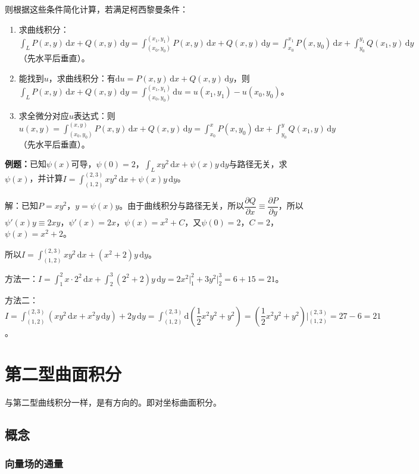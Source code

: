 则根据这些条件简化计算，若满足柯西黎曼条件：

\begin{enumerate}
    \item 求曲线积分：$\int_LP(x,y)\,\textrm{d}x+Q(x,y)\,\textrm{d}y=\int_{(x_0,y_0)}^{(x_1,y_1)}P(x,y)\,\textrm{d}x+Q(x,y)\,\textrm{d}y=\int_{x_0}^{x_1}P(x,y_0)\,\textrm{d}x+\int_{y_0}^{y_1}Q(x_1,y)\,\textrm{d}y$（先水平后垂直）。
    \item 能找到$u$，求曲线积分：有$\textrm{d}u=P(x,y)\,\textrm{d}x+Q(x,y)\,\textrm{d}y$，则$\int_LP(x,y)\,\textrm{d}x+Q(x,y)\,\textrm{d}y=\int_{(x_0,y_0)}^{(x_1,y_1)}\textrm{d}u=u(x_1,y_1)-u(x_0,y_0)$。
    \item 求全微分对应$u$表达式：则$u(x,y)=\int_{(x_0,y_0)}^{(x,y)}P(x,y)\,\textrm{d}x+Q(x,y)\,\textrm{d}y=\int_{x_0}^xP(x,y_0)\,\textrm{d}x+\int_{y_0}^yQ(x_1,y)\,\textrm{d}y$（先水平后垂直）。
\end{enumerate}

\textbf{例题：}已知$\psi(x)$可导，$\psi(0)=2$，$\int_Lxy^2\,\textrm{d}x+\psi(x)y\,\textrm{d}y$与路径无关，求$\psi(x)$，并计算$I=\int_{(1,2)}^{(2,3)}xy^2\,\textrm{d}x+\psi(x)y\,\textrm{d}y$。

解：已知$P=xy^2$，$y=\psi(x)y$。由于曲线积分与路径无关，所以$\dfrac{\partial Q}{\partial x}\equiv\dfrac{\partial P}{\partial y}$，所以$\psi'(x)y\equiv2xy$，$\psi'(x)=2x$，$\psi(x)=x^2+C$，又$\psi(0)=2$，$C=2$，$\psi(x)=x^2+2$。

所以$I=\int_{(1,2)}^{(2,3)}xy^2\,\textrm{d}x+(x^2+2)y\,\textrm{d}y$。

方法一：$I=\int_1^2x\cdot2^2\,\textrm{d}x+\int_2^3(2^2+2)y\,\textrm{d}y=2x^2\vert_1^2+3y^2\vert_2^3=6+15=21$。

方法二：$I=\int_{(1,2)}^{(2,3)}(xy^2\,\textrm{d}x+x^2y\,\textrm{d}y)+2y\,\textrm{d}y=\int_{(1,2)}^{(2,3)}\textrm{d}(\dfrac{1}{2}x^2y^2+y^2)=(\dfrac{1}{2}x^2y^2+y^2)|_{(1,2)}^{(2,3)}=27-6=21$。

\section{第二型曲面积分}

与第二型曲线积分一样，是有方向的。即对坐标曲面积分。

\subsection{概念}

\subsubsection{向量场的通量}

